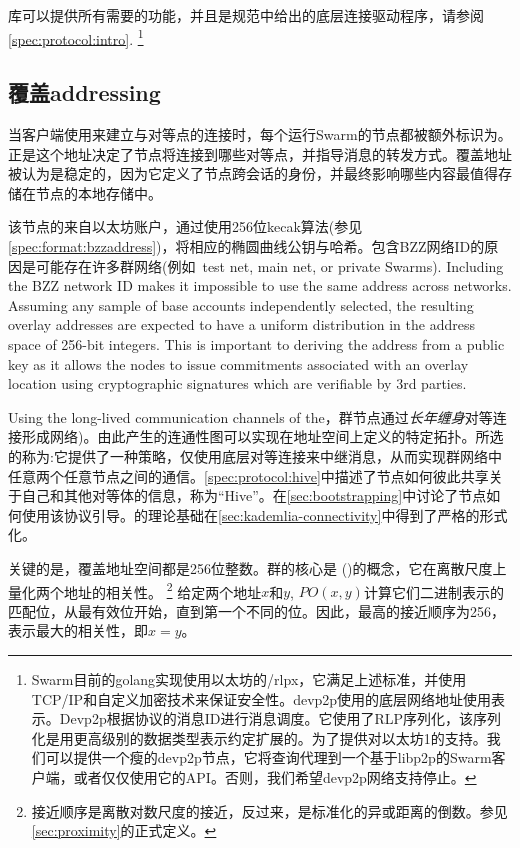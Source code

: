 库可以提供所有需要的功能，并且是规范中给出的底层连接驱动程序，请参阅\ref{spec:protocol:intro}.%
%
\footnote{Swarm目前的golang实现使用以太坊的/rlpx，它满足上述标准，并使用TCP/IP和自定义加密技术来保证安全性。devp2p使用的底层网络地址使用表示。Devp2p根据协议的消息ID进行消息调度。它使用了RLP序列化，该序列化是用更高级别的数据类型表示约定扩展的。为了提供对以太坊1的支持。我们可以提供一个瘦的devp2p节点，它将查询代理到一个基于libp2p的Swarm客户端，或者仅仅使用它的API。否则，我们希望devp2p网络支持停止。}

\subsection{覆盖addressing\statusgreen}\label{sec:overlay-addressing} 
\green{}

当客户端使用来建立与对等点的连接时，每个运行Swarm的节点都被额外标识为。正是这个地址决定了节点将连接到哪些对等点，并指导消息的转发方式。覆盖地址被认为是稳定的，因为它定义了节点跨会话的身份，并最终影响哪些内容最值得存储在节点的本地存储中。

该节点的来自以太坊账户，通过使用256位kecak算法(参见\ref{spec:format:bzzaddress})，将相应的椭圆曲线公钥与哈希。包含BZZ网络ID的原因是可能存在许多群网络(例如\ test net, main net, or private Swarms). Including the BZZ network ID makes it impossible to use the same address across networks. Assuming any sample of base accounts independently selected, the resulting overlay addresses are expected to have a uniform distribution in the address space of 256-bit integers. This is important to deriving the address from a public key as it allows the nodes to issue commitments associated with an overlay location using cryptographic signatures which are verifiable by 3rd parties. 

Using the long-lived communication channels of the，群节点通过\emph{长年缠身}对等连接形成网络)。由此产生的连通性图可以实现在地址空间上定义的特定拓扑。所选的称为:它提供了一种策略，仅使用底层对等连接来中继消息，从而实现群网络中任意两个任意节点之间的通信。\ref{spec:protocol:hive}中描述了节点如何彼此共享关于自己和其他对等体的信息，称为“Hive”。在\ref{sec:bootstrapping}中讨论了节点如何使用该协议引导。的理论基础在\ref{sec:kademlia-connectivity}中得到了严格的形式化。

关键的是，覆盖地址空间都是256位整数。群的核心是 ()的概念，它在离散尺度上量化两个地址的相关性。%
%
\footnote{接近顺序是离散对数尺度的接近，反过来，是标准化的异或距离的倒数。参见\ref{sec:proximity}的正式定义。}
%
给定两个地址$x$和$y$, $\mathit{PO}(x,y)$计算它们二进制表示的匹配位，从最有效位开始，直到第一个不同的位。因此，最高的接近顺序为256，表示最大的相关性，即$x=y$。

